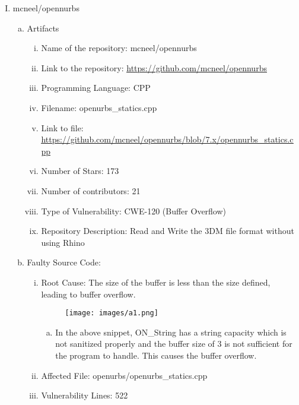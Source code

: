 \documentclass[14pt,a4paper]{report}
\begin{document}
\begin{enumerate}[I.]
    \item mcneel/opennurbs
    \begin{enumerate}[a.]
        \item Artifacts 
        \begin{enumerate}[i.]
            \item Name of the repository: mcneel/opennurbs
            \item Link to the repository: \underline {\href{https://github.com/mcneel/opennurbs}{https://github.com/mcneel/opennurbs}}
            \item Programming Language: CPP
            \item Filename: openurbs\_statics.cpp
            \item Link to file: \underline{\href{https://github.com/mcneel/opennurbs/blob/7.x/opennurbs\_statics.cpp}{https://github.com/mcneel/opennurbs/blob/7.x/opennurbs\_statics.cpp}}
            \item Number of Stars: 173
            \item Number of contributors: 21
            \item Type of Vulnerability: CWE-120 (Buffer Overflow)
            \item Repository Description: Read and Write the 3DM file format without using Rhino
        \end{enumerate}
        \item Faulty Source Code:
            \begin{enumerate}[i.]
                \item Root Cause: The size of the buffer is less than the size defined, leading to buffer overflow.
                \begin{figure}[h!]
                    \centering
                    \texttt{[image: images/a1.png]}
                \end{figure}
                    \begin{enumerate}[a.]
                        \item In the above snippet, ON\_String has a string capacity which is not sanitized properly and the buffer size of 3 is not sufficient for the program to handle. This causes the buffer overflow.
                    \end{enumerate}
                \item Affected File: openurbs/openurbs\_statics.cpp
                \item Vulnerability Lines: 522

\end{enumerate}
\end{enumerate}
\end{enumerate}
\end{document}
